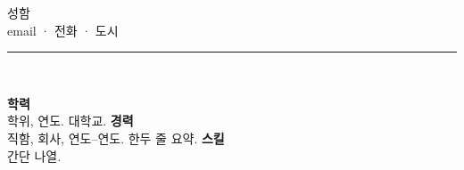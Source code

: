 \documentclass[11pt,a4paper]{article}
\begin{document}
\begin{center}
\vspace{0.5cm}
{\LARGE 성함}\\[0.8em]
email \quad · \quad 전화 \quad · \quad 도시\\[0.6em]
\rule{1.8cm}{2.2cm}\\[0.6em]
\end{center}
\vspace{1em}
\textbf{학력}\\
학위, 연도. 대학교.
\vspace{0.8em}
\textbf{경력}\\
직함, 회사, 연도--연도. 한두 줄 요약.
\vspace{0.8em}
\textbf{스킬}\\
간단 나열.
\end{document}
